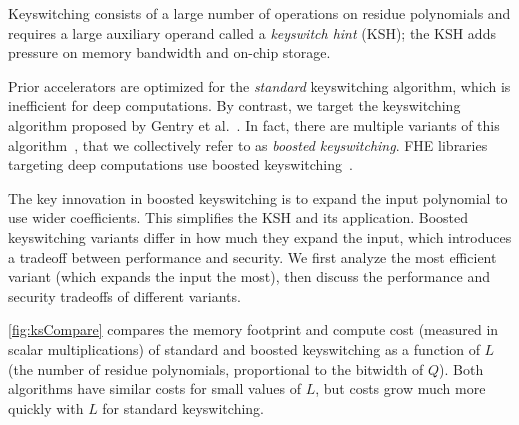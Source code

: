 
Keyswitching consists of a large number of operations on residue polynomials and 
requires a large auxiliary operand called a  \emph{keyswitch hint} (KSH);
the KSH adds pressure on memory bandwidth and on-chip storage.


Prior accelerators are optimized for the \emph{standard} keyswitching algorithm,
which is inefficient for deep computations.
By contrast, we target the keyswitching algorithm
proposed by Gentry et al.~\cite[Section 3.1]{gentry:crypto2012:homomorphic}.
In fact, there are multiple variants of this algorithm~\cite[Section 5.3.4]{halevi2020helib},
that we collectively refer to as \emph{boosted keyswitching}.
FHE libraries targeting deep computations
use boosted keyswitching~\cite{gentry:crypto2012:homomorphic,halevi2020helib,heaan,mouchet2020lattigo}.

The key innovation in boosted keyswitching is to expand the input polynomial to use wider coefficients.
This simplifies the KSH and its application.
Boosted keyswitching variants differ in how much they expand the input,
which introduces a tradeoff between performance and security.
We first analyze the most efficient variant (which expands the input the most),
then discuss the performance and security tradeoffs of different variants.



\autoref{fig:ksCompare} compares the memory footprint and compute cost (measured in scalar multiplications)
of standard and boosted keyswitching as a function of $L$ (the number of residue polynomials,
proportional to the bitwidth of $Q$).
Both algorithms have similar costs for small values of $L$, but costs
grow much more quickly with $L$ for standard keyswitching.

